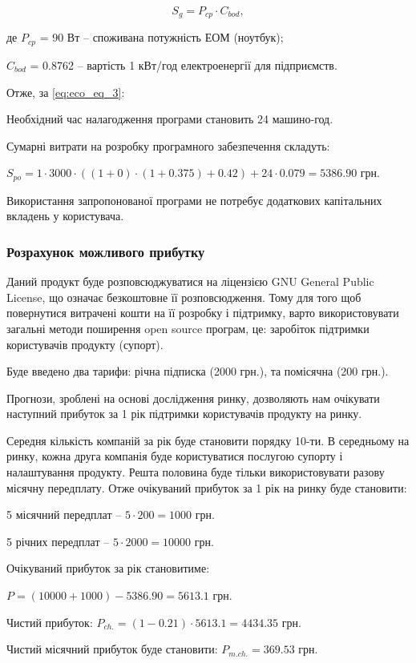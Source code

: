 \begin{equation}\label{eq:eco_eq_3}
	S_{g} = P_{cp}\cdot{C_{bod}},
\end{equation}
\par де $P_{cp}$ = 90 Вт -- споживана потужність ЕОМ (ноутбук);
\par $C_{bod}$ = 0.8762 -- вартість 1 кВт/год електроенергії для підприємств.

\par Отже, за \eqref{eq:eco_eq_3}:
\begin{center}
\end{center}

\par Необхідний час налагодження програми становить 24 машино-год.
\par Сумарні витрати на розробку програмного забезпечення складуть:
	\par
\begin{center}
	$S_{po} = 1\cdot3000\cdot((1+0)\cdot(1+0.375)+0.42)+24\cdot0.079=5386.90$ грн.
\end{center}
\par Використання запропонованої програми не потребує додаткових капітальних вкладень у користувача.


\subsubsection{Розрахунок можливого прибутку}
\par Даний продукт буде розповсюджуватися на ліцензією GNU General Public License, що означає безкоштовне її розповсюдження. Тому для того щоб повернутися витрачені кошти на її розробку і підтримку, варто використовувати загальні методи поширення open source програм, це: заробіток підтримки користувачів продукту (супорт). 
\par Буде введено два тарифи: річна підписка (2000 грн.), та помісячна (200 грн.).
\par Прогнози, зроблені на основі дослідження ринку, дозволяють нам очікувати наступний прибуток за 1 рік підтримки користувачів продукту на ринку.
\par Середня кількість компаній за рік буде становити порядку 10-ти. В середньому на ринку, кожна друга компанія буде користуватися послугою супорту і налаштування продукту. Решта половина буде тільки використовувати разову місячну передплату. Отже очікуваний прибуток за 1 рік на ринку буде становити:
\par 5 місячний передплат -- $5\cdot200 = 1000$ грн.
\par 5 річних передплат -- $5\cdot2000 = 10000$ грн.
\par Очікуваний прибуток за рік становитиме: 
\par $P = (10000+1000)-5386.90 = 5613.1$ грн.
\par Чистий прибуток: $P_{ch.} = (1-0.21)\cdot5613.1=4434.35$ грн.
\par Чистий місячний прибуток буде становити: $P_{m.ch.}=369.53$ грн.



